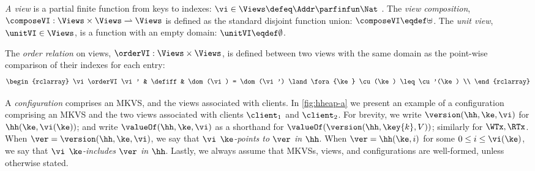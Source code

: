 \begin{definition}[Views]
\label{def:view}
\label{def:cuts}
\label{def:views}
\emph{A view} is a partial finite function from keys to indexes:
$
\vi \in \Views \defeq \Addr \parfinfun \Nat 
$ .                                                                 
The \emph{view composition}, $\composeVI: \Views \times \Views \rightharpoonup \Views$ is defined as the standard disjoint function union: $\composeVI \eqdef \uplus$. 
The \emph{unit view}, $\unitVI \in \Views$, is a function with an empty domain: $\unitVI \eqdef \emptyset$. 

The \emph{order relation} on views, $\orderVI: \Views \times \Views$, is defined between two views with the same domain as the point-wise comparison of their indexes for each entry: 
\[
\begin{rclarray}
    \vi \orderVI \vi' & \defiff & \dom(\vi) = \dom(\vi') \land \fora{\ke} \cu(\ke) \leq \cu'(\ke) \\
\end{rclarray}
\]
\end{definition}

 A \emph{configuration} comprises an MKVS, and the views associated with clients.
In \cref{fig:hheap-a} we present an example of a configuration comprising an MKVS and the two views associated with clients $\client_1$ and $\client_2$. 
For brevity, we write $\version(\hh, \ke, \vi)$ for $\hh(\ke, \vi(\ke))$; 
and write $\valueOf(\hh, \ke, \vi)$ as a shorthand for $ \valueOf(\version(\hh, \key{k}, V))$; similarly for $\WTx, \RTx$.
When $\ver = \version(\hh, \ke, \vi)$, we say that \emph{$\vi$ $\ke$-points to $\ver$ in $\hh$}. 
When $\ver = \hh(\ke, i)$ for some $0 \leq i \le \vi(\ke)$, we say that \emph{$\vi$ $\ke$-includes $\ver$ in $\hh$}.
Lastly, we always assume that MKVSs, views, and configurations are well-formed, unless otherwise stated.


